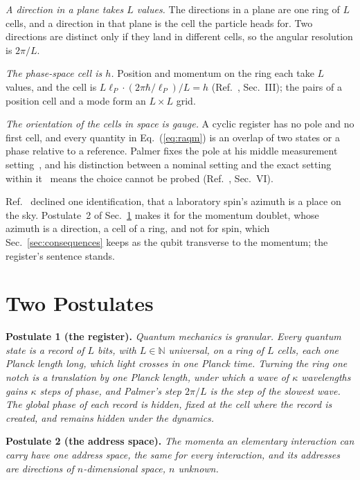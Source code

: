 \documentclass[aps,prd,twocolumn,superscriptaddress,nofootinbib]{revtex4-2}
\begin{document}
\textit{A direction in a plane takes $L$ values.} The directions in a plane are one ring of $L$ cells, and a direction in that plane is the cell the particle heads for. Two directions are distinct only if they land in different cells, so the angular resolution is $2\pi/L$.

\textit{The phase-space cell is $h$.} Position and momentum on the ring each take $L$ values, and the cell is $L\ell_P\cdot(2\pi\hbar/\ell_P)/L = h$ (Ref.~\cite{korytko2026c}, Sec.~III); the pairs of a position cell and a mode form an $L\times L$ grid.

\textit{The orientation of the cells in space is gauge.} A cyclic register has no pole and no first cell, and every quantity in Eq.~(\ref{eq:raqm}) is an overlap of two states or a phase relative to a reference. Palmer fixes the pole at his middle measurement setting~\cite{palmer2026c}, and his distinction between a nominal setting and the exact setting within it~\cite{palmer2024} means the choice cannot be probed (Ref.~\cite{korytko2026c}, Sec.~VI).

Ref.~\cite{korytko2026c} declined one identification, that a laboratory spin's azimuth is a place on the sky. Postulate~2 of Sec.~\ref{sec:postulates} makes it for the momentum doublet, whose azimuth is a direction, a cell of a ring, and not for spin, which Sec.~\ref{sec:consequences} keeps as the qubit transverse to the momentum; the register's sentence stands.

\section{Two Postulates}
\label{sec:postulates}

\textbf{Postulate 1 (the register).} \emph{Quantum mechanics is granular. Every quantum state is a record of $L$ bits, with $L\in\mathbb{N}$ universal, on a ring of $L$ cells, each one Planck length long, which light crosses in one Planck time. Turning the ring one notch is a translation by one Planck length, under which a wave of $\kappa$ wavelengths gains $\kappa$ steps of phase, and Palmer's step $2\pi/L$ is the step of the slowest wave. The global phase of each record is hidden, fixed at the cell where the record is created, and remains hidden under the dynamics.}

\textbf{Postulate 2 (the address space).} \emph{The momenta an elementary interaction can carry have one address space, the same for every interaction, and its addresses are directions of $n$-dimensional space, $n$ unknown.}
\end{document}
